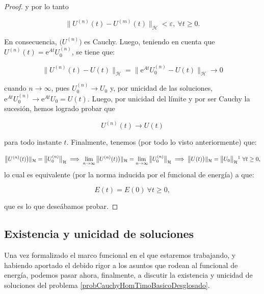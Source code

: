 \begin{proof}
    y por lo tanto

    \[\big \lVert U^{(n)}(t) - U^{(m)}(t) \big \rVert_{\mathcal{H}} < \varepsilon, \ \forall t \geq 0.\]

    En consecuencia, $\big( U^{(n)}\big)$ es Cauchy. Luego, teniendo en cuenta que $U^{(n)}(t) = \mathrm{e}^{At}U_0^{(n)}$, se tiene que:

    \[\big\lVert U^{(n)}(t) - U(t)\big\rVert_{\mathcal{H}} = \big\lVert \mathrm{e}^{At}U_0^{(n)} - U(t)\big\rVert_{\mathcal{H}} \rightarrow 0\]

    cuando $n \rightarrow \infty$, pues $U_0^{(n)} \rightarrow U_0$ y, por unicidad de las soluciones, $\mathrm{e}^{At}U_0^{(n)} \rightarrow \mathrm{e}^{At}U_0 = U(t)$. Luego, por unicidad del límite y por ser Cauchy la sucesión, hemos logrado probar que

    \[U^{(n)}(t) \rightarrow U(t)\]
    
    para todo instante $t$. Finalmente, tenemos (por todo lo visto anteriormente) que:

    \[\big\lVert U^{(n)}(t)\big)\rVert_{\mathcal{H}} = \big\lVert U^{(n)}_0\big\rVert_{\mathcal{H}} \implies \lim_{n\rightarrow \infty}\big\lVert U^{(n)}(t)\big)\rVert_{\mathcal{H}} = \lim_{n\rightarrow \infty}\big\lVert U^{(n)}_0\big\rVert_{\mathcal{H}} \implies \big\lVert U(t)\big)\rVert_{\mathcal{H}} = \big\lVert U_0\big\rVert_{\mathcal{H}}\footnotemark \ \forall t \geq 0,\]
    lo cual es equivalente (por la norma inducida por el funcional de energía) a que:

    \[E(t) = E(0) \ \forall t \geq 0,\]

    que es lo que deseábamos probar.
\end{proof}

\subsection{Existencia y unicidad de soluciones}
\label{ch:teoriaVigas:section:timoshenkoFunc:subsection:existenciaYUnicidad}

Una vez formalizado el marco funcional en el que estaremos trabajando, y habiendo aportado el debido rigor a los asuntos que rodean al funcional de energía, podemos pasar ahora, finalmente, a discutir la existencia y unicidad de soluciones del problema \eqref{probCauchyHomTimoBasicoDesglosado}.

